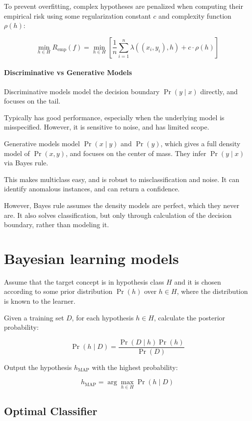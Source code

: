 \documentclass{idc_msc}
\begin{document}
To prevent overfitting, complex hypotheses are penalized when computing their empirical risk using some regularization constant \(c\) and complexity function \(\rho(h)\):

\[\min_{h \in H} R_{\text{emp}}(f) = \min_{h \in H} \left[\frac{1}{n}\sum_{i=1}^n \lambda\left((x_i,y_i), h\right) + c \cdot \rho(h)\right]\]

\paragraph{Discriminative vs Generative Models}

Discriminative models model the decision boundary \(\Pr(y \mid x)\) directly, and focuses on the tail.

Typically has good performance, especially when the underlying model is misspecified.
However, it is sensitive to noise, and has limited scope.

Generative models model \(\Pr(x \mid y)\) and \(\Pr(y)\), which gives a full density model of \(\Pr(x,y)\), and focuses on the center of mass.
They infer \(\Pr(y \mid x)\) via Bayes rule.

This makes multiclass easy, and is robust to misclassification and noise.
It can identify anomalous instances, and can return a confidence.

However, Bayes rule assumes the density models are perfect, which they never are.
It also solves classification, but only through calculation of the decision boundary, rather than modeling it.

\section{Bayesian learning models}

Assume that the target concept is in hypothesis class \(H\) and it is chosen according to some prior distribution \(\Pr(h)\) over \(h \in H\), where the distribution is known to the learner.

Given a training set \(D\), for each hypothesis \(h \in H\), calculate the posterior probability:

\[\Pr(h \mid D) = \frac{\Pr(D \mid h) \Pr(h)}{\Pr(D)}\]

Output the hypothesis \(h_{\text{MAP}}\) with the highest probability:

\[h_{\text{MAP}} = \arg\max_{h\in H} \Pr(h \mid D)\]

\subsection{Optimal Classifier}
\end{document}
